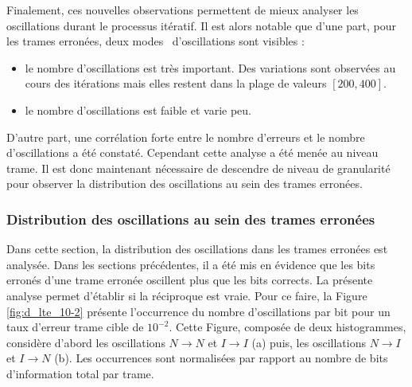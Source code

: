 Finalement, ces nouvelles observations permettent de mieux analyser les oscillations durant le processus itératif. Il est alors 
notable que d'une part, pour les trames erronées, deux \og modes \fg ~d'oscillations sont visibles :
\begin{itemize}
	\item le nombre d'oscillations est très important. Des variations sont observées au cours des itérations mais elles 
	restent dans la plage de valeurs $[200,400]$.
	\item le nombre d'oscillations est faible et varie peu.
\end{itemize}

D'autre part, une corrélation forte entre le nombre d'erreurs et le nombre d'oscillations a été constaté. Cependant 
cette analyse a été menée au niveau trame. Il est donc maintenant nécessaire de descendre de niveau de granularité pour observer 
la distribution des oscillations au sein des trames erronées.



\subsubsection{Distribution des oscillations au sein des trames erronées} 
Dans cette section, la distribution des oscillations dans les trames erronées est analysée. Dans les sections précédentes,
il a été mis en évidence que les bits erronés d'une trame erronée oscillent plus que les bits corrects. La présente analyse permet
d'établir si la réciproque est vraie. Pour ce faire, la Figure \ref{fig:d_lte_10-2} présente l’occurrence du nombre d'oscillations par bit pour un taux 
d'erreur trame cible de $10^{-2}$. Cette Figure, composée de deux histogrammes, considère d'abord les oscillations $N\rightarrow N$ et 
$I\rightarrow I$ (a) puis, les oscillations $N\rightarrow I$ et $I\rightarrow N$ (b). Les occurrences sont normalisées 
par rapport au nombre de bits d'information total par trame.


